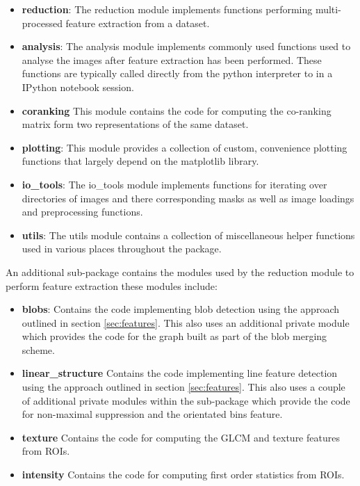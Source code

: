\begin{itemize}
	\item {\bf reduction}: The reduction module implements functions performing multi-processed feature extraction from a dataset.
	\item {\bf analysis}: The analysis module implements commonly used functions used to analyse the images after feature extraction has been performed. These functions are typically called directly from the python interpreter to in a IPython notebook session.
	\item {\bf coranking} This module contains the code for computing the co-ranking matrix form two representations of the same dataset.
	\item {\bf plotting}: This module provides a collection of custom, convenience plotting functions that largely depend on the matplotlib library.
	\item {\bf io\_tools}: The io\_tools module implements functions for iterating over directories of images and there corresponding masks as well as image loadings and preprocessing functions.
	\item {\bf utils}: The utils module contains a collection of miscellaneous helper functions used in various places throughout the package.
\end{itemize}

An additional sub-package contains the modules used by the reduction module to perform feature extraction these modules include:

\begin{itemize}
	\item {\bf blobs}: Contains the code implementing blob detection using the approach outlined in section \ref{sec:features}. This also uses an additional private module which provides the code for the graph built as part of the blob merging scheme.
	\item {\bf linear\_structure} Contains the code implementing line feature detection using the approach outlined in section \ref{sec:features}. This also uses a couple of additional private modules within the sub-package which provide the code for non-maximal suppression and the orientated bins feature. 
	\item {\bf texture} Contains the code for computing the GLCM and texture features from ROIs.
	\item {\bf intensity} Contains the code for computing first order statistics from ROIs.
\end{itemize}

